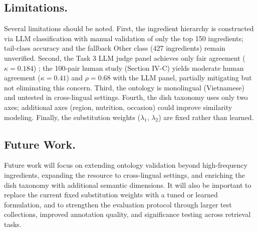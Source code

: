 \label{sec:limitations}

\subsection{Limitations.}


Several limitations should be noted. First, the ingredient hierarchy is constructed via LLM classification with manual validation of only the top 150 ingredients; tail-class accuracy and the fallback Other class (427 ingredients) remain unverified. Second, the Task 3 LLM judge panel achieves only fair agreement ($\kappa = 0.184$) \cite{zheng2023judge, chen2024judgebias, huang2025llmjudge}; the 100-pair human study (Section IV-C) yields moderate human agreement ($\kappa = 0.41$) 
and $\rho = 0.68$ with the LLM panel, partially mitigating but not eliminating this concern. Third, the ontology is monolingual (Vietnamese) and untested in cross-lingual settings. Fourth, the dish taxonomy uses only two axes; additional axes (region, nutrition, occasion) could improve similarity modeling. Finally, the substitution weights ($\lambda_1$, $\lambda_2$) are fixed rather than learned.

\subsection{Future Work.}
Future work will focus on extending ontology validation beyond high-frequency ingredients, expanding the resource to cross-lingual settings, and enriching the dish taxonomy with additional semantic dimensions. It will also be important to replace the current fixed substitution weights with a tuned or learned formulation, and to strengthen the evaluation protocol through larger test collections, improved annotation quality, and significance testing across retrieval tasks.